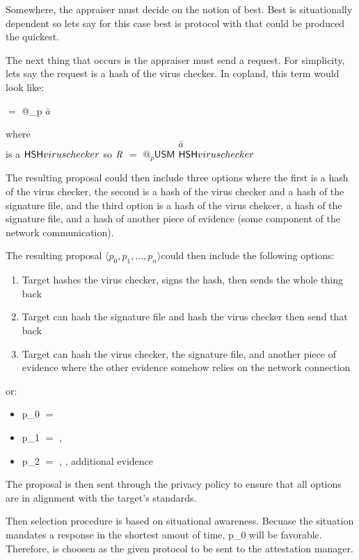 \documentclass[10pt]{report}
\newcommand{\squash}{\itemsep=0pt\parskip=0pt}
\newcommand{\req}[0]{\cnc{\emph{R}}}
\newcommand{\proposal}[0]{$\langle p_0,p_1,\ldots,p_n\rangle$}
\newcommand{\bara}[0]{$\mathit{\bar{a}}$}
\begin{document}
Somewhere, the appraiser must decide on the notion of best. Best is
situationally dependent so lets say for this case best is protocol
with that could be produced the quickest. 

The next thing that occurs is the appraiser must send a request.
For simplicity, lets say the request is a hash of the virus checker. In
copland, this term would look like:

\req $=$ @_{p} \bara

where $\bara$  is a  $\mathsf{HSH}{virus checker}$
so $\req$ $=$ $@_{p}\mathsf{USM}$ $\mathsf{HSH}{virus checker}$

The resulting proposal could then include three options where the first
is a hash of the virus checker, the second is a hash of the virus checker
and a hash of the signature file, and the third option is a hash of the
virus chekcer, a hash of the signature file, and a hash of another piece
of evidence (some component of the network communication). 

The resulting proposal \proposal could then include the following options:

\begin{enumerate}
  \squash
\item Target hashes the virus checker, signs the hash, then sends the
  whole thing back
\item Target can hash the signature file and hash the virus checker
  then send that back
\item Target can hash the virus checker, the signature file, and another
  piece of evidence where the other evidence somehow relies on the network
  connection
\end{enumerate}

or: 

\begin{itemize}
  \squash
\item p_0 $=$  
\item p_1 $=$  {, }
\item p_2 $=$  {, }, additional
  evidence
\end{itemize}


The proposal is then sent through the privacy policy to ensure that
all options are in alignment with the target's standards.

Then selection procedure is based on situational awareness. Becuase the
situation mandates a response in the shortest amout of time, p_0 will be
favorable. Therefore,  is choosen as the
given protocol to be sent to the attestation manager.
\end{document}
